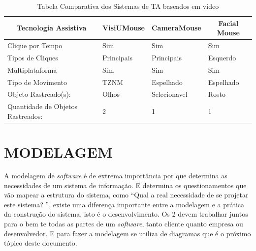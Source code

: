 \begin{table}[tbp]
\centering
\caption{Tabela Comparativa dos Sistemas de TA baseados em vídeo}
\label{tabela-comparativa}
\begin{tabular}{|l|l|l|l|}
\hline
\multicolumn{1}{|c|}{\textbf{Tecnologia Assistiva}} & \multicolumn{1}{c|}{\textbf{VisiUMouse}} & \multicolumn{1}{c|}{\textbf{CameraMouse}} & \multicolumn{1}{c|}{\textbf{Facial Mouse}} \\ \hline
Clique por Tempo                                     & \cellcolor[HTML]{67FD9A}Sim              & \cellcolor[HTML]{67FD9A}Sim                & \cellcolor[HTML]{67FD9A}Sim                \\ \hline
Tipos  de Cliques                                    & Principais                               & Principais                                 & Esquerdo                                   \\ \hline
Multiplataforma                                     & \cellcolor[HTML]{67FD9A}Sim              & \cellcolor[HTML]{67FD9A}Sim                & \cellcolor[HTML]{67FD9A}Sim                \\ \hline
Tipo de Movimento                                   & TZNM                                     & Espelhado                                  & Espelhado                                  \\ \hline
Objeto Rastreado(s):                                & Olhos                                    & Selecionavel                               & Rosto                                      \\ \hline
Quantidade de Objetos Rastreados:                   & 2                                        & 1                                          & 1                                          \\ \hline
\end{tabular}
\end{table}


\chapter{MODELAGEM}\label{CAP5}
A modelagem de \textit{software} é de extrema importância por que determina as necessidades de um sistema de informação. E determina os questionamentos que vão mapear a estrutura do sistema, como “Qual a real necessidade de se projetar este sistema? ”, existe uma diferença importante entre a modelagem e a prática da construção do sistema, isto é o desenvolvimento. Os 2 devem trabalhar juntos para o bem te todas as partes de um \textit{software}, tanto cliente quanto empresa ou desenvolvedor. E para fazer a modelagem se utiliza de diagramas que é o próximo tópico deste documento.

